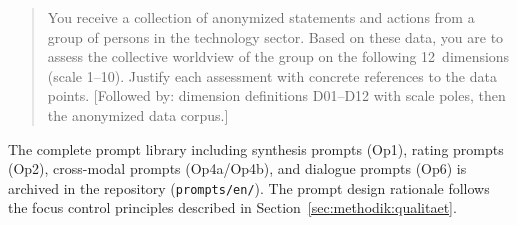 \documentclass[12pt,a4paper]{article}
\begin{document}
\begin{quote}
\small\ttfamily
You receive a collection of anonymized statements and actions from a group of persons in the technology sector. Based on these data, you are to assess the collective worldview of the group on the following 12~dimensions (scale 1--10). Justify each assessment with concrete references to the data points. [Followed by: dimension definitions D01--D12 with scale poles, then the anonymized data corpus.]
\end{quote}

\noindent The complete prompt library including synthesis prompts (Op1), rating prompts (Op2), cross-modal prompts (Op4a/Op4b), and dialogue prompts (Op6) is archived in the repository (\texttt{prompts/en/}). The prompt design rationale follows the focus control principles described in Section~\ref{sec:methodik:qualitaet}.
\end{document}
